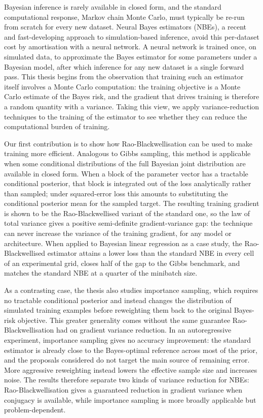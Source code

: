 Bayesian inference is rarely available in closed form, and the
standard computational response, Markov chain Monte Carlo, must typically be
re-run from scratch for every new dataset. Neural Bayes estimators (NBEs), a recent and fast-developing approach to simulation-based inference, 
avoid this per-dataset cost by amortisation with a neural network. A neural network is trained once, on simulated data, to approximate the Bayes estimator for some parameters under a Bayesian model, after which inference for any new dataset is a
single forward pass. This thesis begins from the observation that training such an estimator itself involves a Monte Carlo computation: the training objective is a Monte
Carlo estimate of the Bayes risk, and the gradient that drives
training is therefore a random quantity with a variance. Taking this view, we apply variance-reduction techniques to the training of the estimator to see whether they can reduce the computational burden of training.

Our first contribution is to show how Rao-Blackwellisation can be used to make training more efficient. Analogous to Gibbs sampling, this method is applicable when some conditional distributions of the full Bayesian joint distribution are available in closed form. When a block of the parameter vector has a tractable conditional posterior, that block is integrated out of the loss analytically rather than sampled; under squared-error loss this amounts to substituting the conditional posterior mean for the sampled target. The resulting training gradient is shown to be the Rao-Blackwellised variant of the standard one, so the law of total variance gives a positive semi-definite gradient-variance gap: the technique can never increase the variance of the training gradient, for any model or architecture. When applied to Bayesian linear regression as a case study, the Rao-Blackwellised estimator attains a lower loss than the standard NBE in every cell of an experimental grid, closes half of the gap to the Gibbs benchmark, and matches the standard NBE at a quarter of the minibatch size.

As a contrasting case, the thesis also studies importance sampling, which requires no tractable conditional posterior and instead changes the distribution of simulated training examples before reweighting them back to the original Bayes-risk objective. This greater generality comes without the same guarantee Rao-Blackwellisation had on gradient variance reduction. In an autoregressive experiment, importance sampling gives no accuracy improvement: the standard estimator is already close to the Bayes-optimal reference across most of the prior, and the proposals considered do not target the main source of remaining error. More aggressive reweighting instead lowers the effective sample size and increases noise. The results therefore separate two kinds of variance reduction for NBEs: Rao-Blackwellisation gives a guaranteed reduction in gradient variance when conjugacy is available, while importance sampling is more broadly applicable but problem-dependent.
